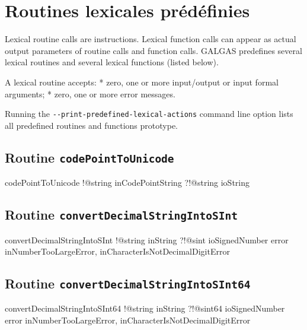 {\section{Routines lexicales prédéfinies}

Lexical routine calls are instructions. Lexical function calls can appear as actual output parameters of routine calls and function calls. GALGAS predefines several lexical routines and several lexical functions (listed below).

A lexical routine accepts:
  * zero, one or more input/output or input formal arguments;
  * zero, one or more error messages.

Running the \texttt{-{}-print-predefined-lexical-actions} command line option lists all predefined routines and functions prototype.

\subsection{Routine \texttt{codePointToUnicode}}

\begin{galgascode}
codePointToUnicode !@string inCodePointString
                   ?!@string ioString
\end{galgascode}

\subsection{Routine \texttt{convertDecimalStringIntoSInt}}

\begin{galgascode}
convertDecimalStringIntoSInt !@string inString
                             ?!@sint ioSignedNumber
                             error inNumberTooLargeError,
                                   inCharacterIsNotDecimalDigitError
\end{galgascode}

\subsection{Routine \texttt{convertDecimalStringIntoSInt64}}

\begin{galgascode}
convertDecimalStringIntoSInt64 !@string inString
                               ?!@sint64 ioSignedNumber
                               error inNumberTooLargeError,
                                     inCharacterIsNotDecimalDigitError
\end{galgascode}

}
